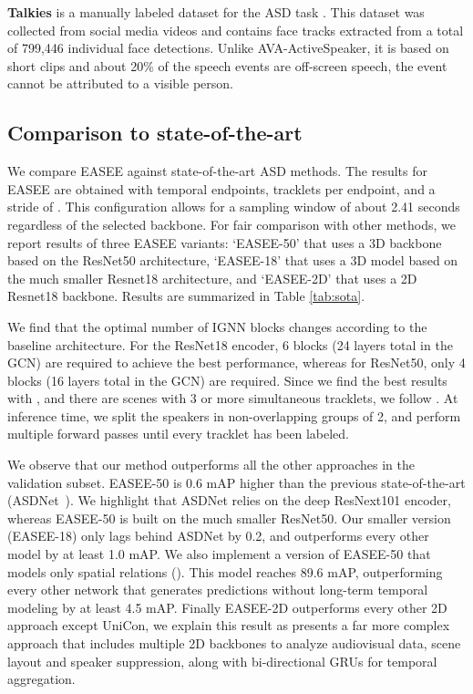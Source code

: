 \documentclass[10pt,twocolumn,letterpaper]{article}
\begin{document}
\textbf{Talkies} is a manually labeled dataset for the ASD task \cite{leon2021maas}. This dataset was collected from social media videos and contains  face tracks extracted from a total of 799,446 individual face detections. Unlike AVA-ActiveSpeaker, it is based on short clips and about 20\% of the speech events are off-screen speech, \ie the event cannot be attributed to a visible person.

\subsection{Comparison to state-of-the-art}\label{subsec:sota}

We compare EASEE against state-of-the-art ASD methods. The results for EASEE are obtained with  temporal endpoints,  tracklets per endpoint, and a stride of . This configuration allows for a sampling window of about 2.41 seconds regardless of the selected backbone. For fair comparison with other methods, we report results of three EASEE variants: `EASEE-50' that uses a 3D backbone based on the ResNet50 architecture, `EASEE-18' that uses a 3D model based on the much smaller Resnet18 architecture, and `EASEE-2D' that uses a 2D Resnet18 backbone. Results are summarized in Table \ref{tab:sota}. 

We find that the optimal number of IGNN blocks changes according to the baseline architecture. For the ResNet18 encoder, 6 blocks (24 layers total in the GCN) are required to achieve the best performance, whereas for ResNet50, only 4 blocks (16 layers total in the GCN) are required. Since we find the best results with , and there are scenes with 3 or more simultaneous tracklets, we follow \cite{leon2021maas}. At inference time, we split the speakers in non-overlapping groups of 2, and perform multiple forward passes until every tracklet has been labeled.

We observe that our method outperforms all the other approaches in the validation subset. EASEE-50 is 0.6 mAP higher than the previous state-of-the-art (ASDNet~\cite{kopuklu2021design}). We highlight that ASDNet relies on the deep ResNext101 encoder, whereas EASEE-50 is built on the much smaller ResNet50. Our smaller version (EASEE-18) only lags behind ASDNet by 0.2, and outperforms every other model by at least 1.0 mAP. We also implement a version of EASEE-50 that models only spatial relations (\ie ). This model reaches 89.6 mAP, outperforming every other network that generates predictions without long-term temporal modeling by at least 4.5 mAP. Finally EASEE-2D outperforms every other 2D approach except UniCon, we explain this result as \cite{zhang2021unicon} presents a far more complex approach that includes multiple 2D backbones to analyze audiovisual data, scene layout and speaker suppression, along with bi-directional GRUs \cite{cho2014properties} for temporal aggregation.
\end{document}
